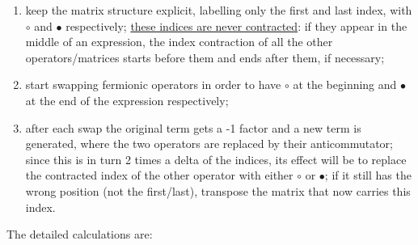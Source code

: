 \documentclass[a4paper,11pt]{article}
\theoremstyle{remark}
\newcommand{\nl}{\vskip 0.3cm}
\newcommand{\ubar}[1]{\underline{#1}}
\begin{document}
  \begin{enumerate}
   \item keep the matrix structure explicit, labelling only the first and last index, with $ \circ$ and $\bullet$ respectively; \ubar{these indices are never contracted}: if they appear in the middle of an expression, the index contraction of all the other operators/matrices starts before them and ends after them, if necessary;
   \item start swapping fermionic operators in order to have $ \circ$ at the beginning and $\bullet$ at the end of the expression respectively; 
   \item after each swap the original term gets a -1 factor and a new term is generated, where the two operators are replaced by their anticommutator; since this is in turn 2 times a delta of the indices, its effect will be to replace the contracted index of the other operator with either $ \circ$ or $\bullet$; if it still has the wrong position (not the first/last), transpose the matrix that now carries this index.
  \end{enumerate}\nl
  The detailed calculations are:
\end{document}
